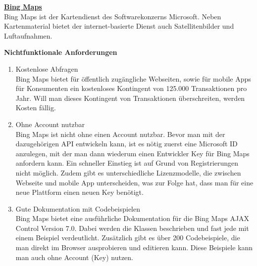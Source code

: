 \textbf{\underline{Bing Maps}}\\
Bing Maps ist der Kartendienst des Softwarekonzerns Microsoft. Neben Kartenmaterial bietet der internet-basierte Dienst auch Satellitenbilder und Luftaufnahmen.

\textbf{Nichtfunktionale Anforderungen}
\begin{enumerate}
\item Kostenlose Abfragen \\
Bing Maps bietet für öffentlich zugängliche Webseiten, sowie für mobile Apps für Konsumenten ein kostenloses Kontingent von 125.000 Transaktionen pro Jahr. Will man dieses Kontingent von Transaktionen überschreiten, werden Kosten fällig.
\cite{microsoft}

\item Ohne Account nutzbar\\
Bing Maps ist nicht ohne einen Account nutzbar. Bevor man mit der dazugehörigen API entwickeln kann, ist es nötig zuerst eine Microsoft ID anzulegen, mit der man dann wiederum einen Entwickler Key für Bing Maps anfordern kann. Ein schneller Einstieg ist auf Grund von Registrierungen nicht möglich. Zudem gibt es unterschiedliche Lizenzmodelle, die zwischen Webseite und mobile App unterscheiden, was zur Folge hat, dass man für eine neue Plattform einen neuen Key benötigt. \cite{gruber2015} \cite{microsoft}

\item Gute Dokumentation mit Codebeispielen\\
Bing Maps bietet eine ausführliche Dokumentation für die Bing Maps AJAX Control Version 7.0. Dabei werden die Klassen beschrieben und fast jede mit einem Beispiel verdeutlicht. 
Zusätzlich gibt es über 200 Codebeispiele, die man direkt im Browser ausprobieren und editieren kann. Diese Beispiele kann man auch ohne Account (Key) nutzen.

\end{enumerate}



